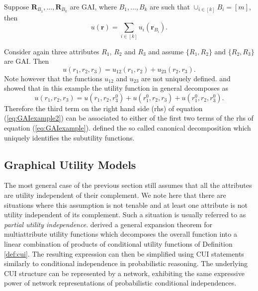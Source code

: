 \begin{proposition}
\label{prop:gai}
Suppose $\bm{R}_{B_1},\dots,\bm{R}_{B_k}$ are GAI, where $B_1,\dots, B_k$ are such that $\cup_{i\in[k]}B_i=[m]$, then
\begin{equation}
\label{eq:GAI}
u(\bm{r})=\sum_{i\in[k]}u_i(\bm{r}_{B_i}).
\end{equation}
\end{proposition}

\begin{example}
Consider again three attributes $R_1$, $R_2$ and $R_3$ and assume $\{R_1,R_2\}$ and $\{R_2,R_3\}$ are GAI. Then
\begin{equation}
\label{eq:GAIexample}
u(r_1,r_2,r_3)=u_{12}(r_1,r_2)+u_{23}(r_2,r_3).
\end{equation} 
Note however that the functions  $u_{12}$ and $u_{23}$ are not uniquely defined. \citet{Braziunas2005} and \citet{fishburn} showed that in this example the utility function in general decomposes as
\begin{equation}
\label{eq:GAIexample2}
u(r_1,r_2,r_3)=u(r_1,r_2,r_3^0)+u(r_1^0,r_2,r_3)+u(r_1^0,r_2,r_3^0).
\end{equation}
Therefore the third term on the right hand side (rhs) of equation (\ref{eq:GAIexample2}) can be associated to either of the first two terms of the rhs of equation (\ref{eq:GAIexample}). \citet{fishburn} defined the so called canonical decomposition which uniquely identifies the subutility functions.
\end{example}

\subsection{Graphical Utility Models}
The most general case of the previous section still assumes that all the attributes are utility independent of their complement. We note here that there are situations where this assumption is not tenable and at least one attribute is not utility independent of its complement. Such a situation is usually referred to as \textit{partial utility independence}. \citet{Abbas2010} derived a general expansion theorem for multiattribute utility functions which decomposes the overall function into a linear combination of products of conditional utility functions of Definition \ref{def:cui}. The resulting expression can then be simplified using CUI statements similarly to conditional independence in probabilistic reasoning. The underlying CUI structure can be represented by a network, exhibiting the same expressive power of network representations of probabilistic conditional independences. 

